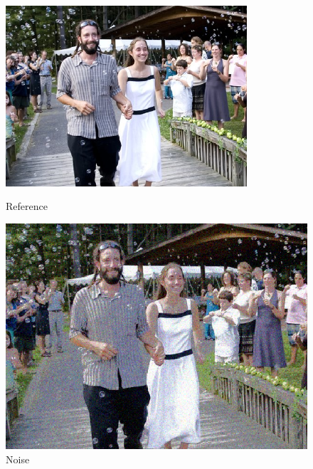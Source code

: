 \begin{figure}
  \includegraphics[width=0.8\textwidth]{images/image17.eps}
  \caption{Reference}
  \label{fig:sub-first}
  
  \includegraphics[width=0.8\linewidth]{images/IMAGE1728.eps}  
  \caption{Noise}
  \label{fig:sub-second}
  \end{figure}

